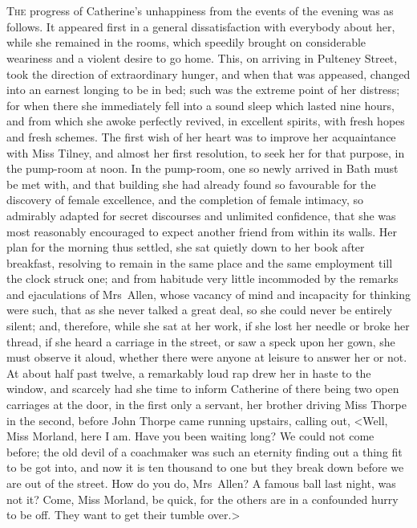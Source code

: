 \chapter[Chapter \thechapter]{} 

 \lettrine{T}{he} progress of Catherine's unhappiness from the events of the evening was as follows. It appeared first in a general dissatisfaction with everybody about her, while she remained in the rooms, which speedily brought on considerable weariness and a violent desire to go home. This, on arriving in Pulteney Street, took the direction of extraordinary hunger, and when that was appeased, changed into an earnest longing to be in bed; such was the extreme point of her distress; for when there she immediately fell into a sound sleep which lasted nine hours, and from which she awoke perfectly revived, in excellent spirits, with fresh hopes and fresh schemes. The first wish of her heart was to improve her acquaintance with Miss Tilney, and almost her first resolution, to seek her for that purpose, in the pump-room at noon. In the pump-room, one so newly arrived in Bath must be met with, and that building she had already found so favourable for the discovery of female excellence, and the completion of female intimacy, so admirably adapted for secret discourses and unlimited confidence, that she was most reasonably encouraged to expect another friend from within its walls. Her plan for the morning thus settled, she sat quietly down to her book after breakfast, resolving to remain in the same place and the same employment till the clock struck one; and from habitude very little incommoded by the remarks and ejaculations of Mrs~Allen, whose vacancy of mind and incapacity for thinking were such, that as she never talked a great deal, so she could never be entirely silent; and, therefore, while she sat at her work, if she lost her needle or broke her thread, if she heard a carriage in the street, or saw a speck upon her gown, she must observe it aloud, whether there were anyone at leisure to answer her or not. At about half past twelve, a remarkably loud rap drew her in haste to the window, and scarcely had she time to inform Catherine of there being two open carriages at the door, in the first only a servant, her brother driving Miss Thorpe in the second, before John Thorpe came running upstairs, calling out, <Well, Miss Morland, here I am. Have you been waiting long? We could not come before; the old devil of a coachmaker was such an eternity finding out a thing fit to be got into, and now it is ten thousand to one but they break down before we are out of the street. How do you do, Mrs~Allen? A famous ball last night, was not it? Come, Miss Morland, be quick, for the others are in a confounded hurry to be off. They want to get their tumble over.> 

